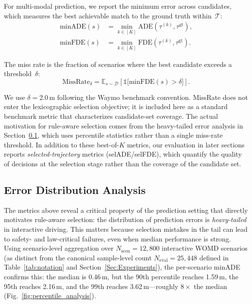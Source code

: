 \noindent
For multi-modal prediction, we report the minimum error across candidates, which measures the best achievable match to the ground truth
within~$\mathcal{T}$:
\begin{align}
\text{minADE}(s) &= \min_{k \in [K]} \text{ADE}(\tau^{(k)}, \tau^{\mathrm{gt}}), \\
\text{minFDE}(s) &= \min_{k \in [K]} \text{FDE}(\tau^{(k)}, \tau^{\mathrm{gt}}).
\end{align}

\begin{definition}
The miss rate is the fraction of scenarios where the best candidate exceeds a threshold~$\delta$:
\begin{equation}
\text{MissRate}_\delta = \mathbb{E}_{s \sim \mathcal{D}} \left[ \mathbb{1}\big[\text{minFDE}(s) > \delta\big] \right].
\end{equation}
\end{definition}

\noindent
We use $\delta = 2.0\,\mathrm{m}$ following the Waymo benchmark convention. MissRate does not enter the lexicographic selection objective; it is included here as a standard benchmark metric that characterizes candidate-set coverage.  The actual motivation for rule-aware selection comes from the heavy-tailed error analysis in Section~\ref{subsec:error_distribution}, which uses percentile statistics rather than a single miss-rate threshold. In addition to these best-of-$K$ metrics, our evaluation in later sections reports \emph{selected-trajectory} metrics (selADE/selFDE), which quantify the quality of decisions at the selection stage rather than the coverage of the candidate set.

\subsection{Error Distribution Analysis}
\label{subsec:error_distribution}

The metrics above reveal a critical property of the prediction setting that directly motivates rule-aware selection: the distribution of prediction errors is \emph{heavy-tailed} in interactive driving.  This matters because selection mistakes in the tail can lead to safety- and law-critical failures, even when median performance is strong.  Using scenario-level aggregation over $N_{\text{scen}}{=}12{,}800$ interactive WOMD scenarios (as distinct from the canonical sample-level count $N_{\text{eval}}{=}25{,}448$ defined in Table~\ref{tab:notation} and Section~\ref{Sec:Experiments}), the per-scenario minADE confirms this: the median is 0.46\,m, but the 90th percentile reaches 1.59\,m, the 95th reaches 2.16\,m, and the 99th reaches 3.62\,m---roughly $8\times$ the median (Fig.~\ref{fig:percentile_analysis}).

